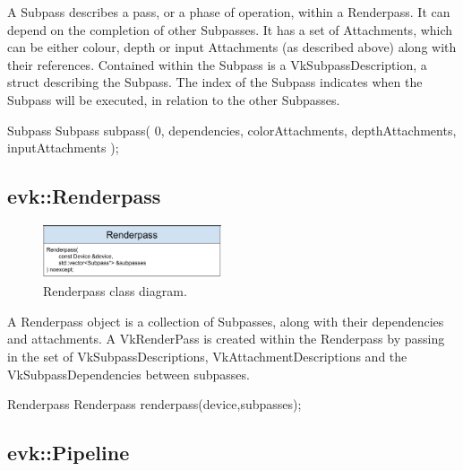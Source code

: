 \documentclass[12pt]{report}
\newcommand{\figurewidth}{0.55\textwidth}
\newcommand{\imagewidth}{0.47\textwidth}
\theoremstyle{definition}
\begin{document}
        A Subpass describes a pass, or a phase of operation, within a
        Renderpass. It can depend on the completion of other Subpasses.
        It has a set of Attachments, which can be either colour, depth or
        input Attachments (as described above) along with their references.
        Contained within the Subpass is a VkSubpassDescription, a struct
        describing the Subpass. The index of the Subpass indicates when the
        Subpass will be executed, in relation to the other Subpasses.

        \begin{usage}{Subpass}
  Subpass subpass(
      0, dependencies, colorAttachments,
      depthAttachments, inputAttachments
  );
        \end{usage}

      \subsection{evk::Renderpass}

        \begin{figure}
          \centering
          \includegraphics[width=\imagewidth]{images/class_renderpass.png}
          \caption{Renderpass class diagram.}
          \label{fig:class_renderpass}
        \end{figure}

        A Renderpass object is a collection of Subpasses, along with their
        dependencies and attachments. A VkRenderPass is created within the
        Renderpass by passing in the set of VkSubpassDescriptions,
        VkAttachmentDescriptions and the VkSubpassDependencies between
        subpasses.

        \begin{usage}{Renderpass}
  Renderpass renderpass(device,subpasses);
        \end{usage}

      \subsection{evk::Pipeline}
\end{document}
